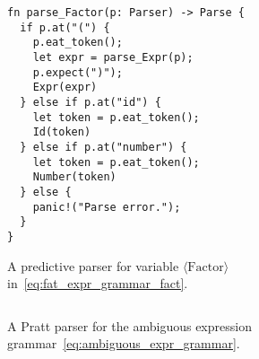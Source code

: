 \documentclass[
  oneside,
  english,
  coorientadorbanca,
  embeddedlogo,
  noabntexcite
]{ufsc-thesis-rn46-2019}
\newcommand{\bnfvars}[1]{\langle\textrm{#1}\rangle}
\begin{document}
\begin{figure}[ht]
  \centering
  \begin{minipage}{0.5\textwidth}
    \begin{verbatim}
fn parse_Factor(p: Parser) -> Parse {
  if p.at("(") {
    p.eat_token();
    let expr = parse_Expr(p);
    p.expect(")");
    Expr(expr)
  } else if p.at("id") {
    let token = p.eat_token();
    Id(token)
  } else if p.at("number") {
    let token = p.eat_token();
    Number(token)
  } else {
    panic!("Parse error.");
  }
}
    \end{verbatim}
  \end{minipage}
  \caption{
    A predictive parser for variable $\bnfvars{Factor}$ in~\eqref{eq:fat_expr_grammar_fact}.
  }\label{fig:predictive_parser_fact}
\end{figure}

\begin{figure}
  \centering
  \begin{minipage}{0.9\textwidth}
    \inputminted[breaklines, linenos, fontsize=\footnotesize]{rust}{code/pratt_example.rs}
  \end{minipage}
  \caption{
    A Pratt parser for the ambiguous expression grammar~\eqref{eq:ambiguous_expr_grammar}.
  }\label{fig:pratt_parser_expr_grammar}
\end{figure}
\end{document}

